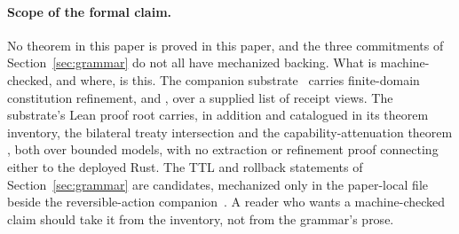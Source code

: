 \paragraph{Scope of the formal claim.}
No theorem in this paper is proved in this paper, and the three commitments of Section~\ref{sec:grammar} do not all have mechanized backing. What is machine-checked, and where, is this. The companion substrate~\cite{programmableSovereignty2026} carries finite-domain constitution refinement,  and , over a supplied list of receipt views. The substrate's Lean proof root carries, in addition and catalogued in its theorem inventory, the bilateral treaty intersection  and the capability-attenuation theorem , both over bounded models, with no extraction or refinement proof connecting either to the deployed Rust. The TTL and rollback statements of Section~\ref{sec:grammar} are candidates, mechanized only in the paper-local file beside the reversible-action companion~\cite{reversibleAction2026}. A reader who wants a machine-checked claim should take it from the inventory, not from the grammar's prose.
